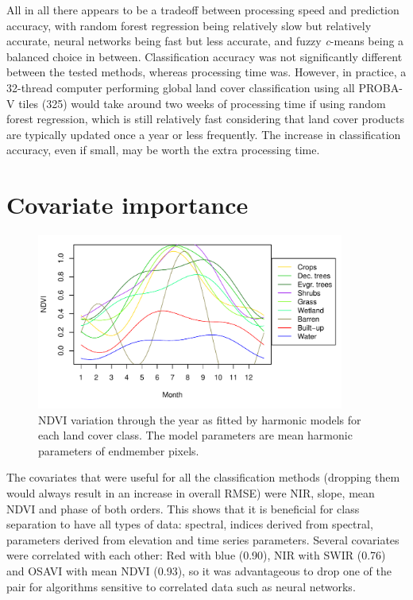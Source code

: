 \documentclass[a4paper,12pt]{scrbook}
\begin{document}
All in all there appears to be a tradeoff between processing speed and prediction accuracy, with random forest regression being relatively slow but relatively accurate, neural networks being fast but less accurate, and fuzzy \textit{c}-means being a balanced choice in between. Classification accuracy was not significantly different between the tested methods, whereas processing time was. However, in practice, a 32-thread computer performing global land cover classification using all PROBA-V tiles (325) would take around two weeks of processing time if using random forest regression, which is still relatively fast considering that land cover products are typically updated once a year or less frequently. The increase in classification accuracy, even if small, may be worth the extra processing time.

\section{Covariate importance}

\begin{figure}
  \centering
  \includegraphics[width=0.9\textwidth]{thesis-figures/timeseries}
  \caption{NDVI variation through the year as fitted by harmonic models for each land cover class. The model parameters are mean harmonic parameters of endmember pixels.}
  \label{fig-timeseries}
\end{figure}

The covariates that were useful for all the classification methods (dropping them would always result in an increase in overall RMSE) were NIR, slope, mean NDVI and phase of both orders. This shows that it is beneficial for class separation to have all types of data: spectral, indices derived from spectral, parameters derived from elevation and time series parameters. Several covariates were correlated with each other: Red with blue (0.90), NIR with SWIR (0.76) and OSAVI with mean NDVI (0.93), so it was advantageous to drop one of the pair for algorithms sensitive to correlated data such as neural networks.
\end{document}
